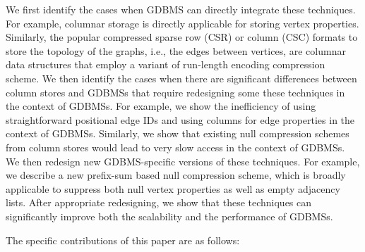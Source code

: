 We first identify the cases when GDBMS can directly integrate these techniques. For example, columnar storage is directly applicable for storing vertex properties. Similarly, the popular compressed sparse row (CSR) or column (CSC) formats to store the topology of the graphs, i.e., the edges between vertices, are columnar data structures that employ a variant of run-length encoding compression scheme. We then identify the cases when there are significant differences between column stores and GDBMSs that require redesigning some these techniques in the context of GDBMSs. For example, we show the inefficiency of using straightforward positional edge IDs and using columns for edge properties in the context of GDBMSs. Similarly, we show that existing null compression schemes from column stores would lead to very slow access in the context of GDBMSs. We then redesign new GDBMS-specific versions of these techniques. For example, we describe a new prefix-sum based null compression scheme, which is broadly applicable to suppress both null vertex properties as well as empty adjacency lists. After appropriate redesigning, we show that these techniques can significantly improve both the scalability and the performance of GDBMSs.

The specific contributions of this paper are as follows:

